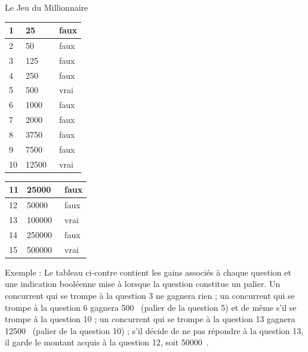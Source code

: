 \begin{Exercice}{Le Jeu du Millionnaire}
	\begin{minipage}[t][][b]{2.5cm}
	\begin{center}
	\begin{footnotesize}
	\begin{tabular}{|l|l|l|}\hline
	  1 &      25~\texteuro & faux \\\hline
	  2 &      50~\texteuro & faux \\\hline
	  3 &     125~\texteuro & faux \\\hline
	  4 &     250~\texteuro & faux \\\hline
	  5 &     500~\texteuro & vrai \\\hline
	  6 &    1000~\texteuro & faux \\\hline
	  7 &    2000~\texteuro & faux \\\hline
	  8 &    3750~\texteuro & faux \\\hline
	  9 &    7500~\texteuro & faux \\\hline
	 10 &   12500~\texteuro & vrai \\\hline
	\end{tabular}
	\end{footnotesize}
	\end{center}
	\end{minipage}
%
	\begin{minipage}[t][][b]{3.5cm}
	\begin{center}
	\begin{footnotesize}
	\begin{tabular}{|l|l|l|}\hline
	 11 &   25000~\texteuro & faux \\\hline
	 12 &   50000~\texteuro & faux \\\hline
	 13 &  100000~\texteuro & vrai \\\hline
	 14 &  250000~\texteuro & faux \\\hline
	 15 &  500000~\texteuro & vrai \\\hline
	\end{tabular}
	\end{footnotesize}
	\end{center}
	\end{minipage}
%
	\begin{minipage}[t][][b]{8cm}
	Exemple : Le tableau ci-contre contient les gains associés à chaque 
	question et une indication booléenne mise à
	 lorsque la question
	constitue un palier. Un concurrent qui se
	trompe à la question 3 ne gagnera rien ; un concurrent qui se trompe à
	la question 6 gagnera 500~\texteuro{} (palier de la question 5) et de même s’il
	se trompe à la question 10 ; un concurrent qui se trompe à la question
	13 gagnera 12500~\texteuro{} (palier de la question 10) ; 
	s'il décide de ne pas répondre à la question 13,
	il garde le montant acquis à la question 12, soit 50000~\texteuro.
	\end{minipage}
	

\end{Exercice}
